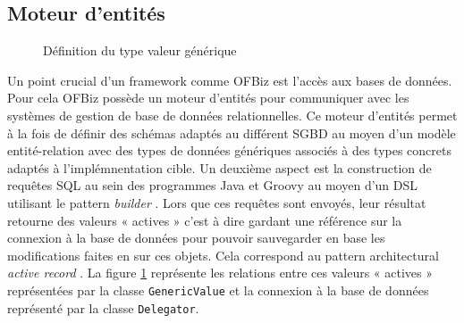 \documentclass[a4paper, 11pt]{report}
\begin{document}
\subsection{Moteur d'entités}

\begin{figure}
  \centering
  \caption{Définition du type valeur générique}
  \label{fig:genericvalue}
\end{figure}

Un point crucial d'un framework comme OFBiz est l'accès aux bases de
données. Pour cela OFBiz possède un moteur d'entités pour communiquer
avec les systèmes de gestion de base de données relationnelles. Ce
moteur d'entités permet à la fois de définir des schémas adaptés au
différent SGBD au moyen d'un modèle entité-relation avec des types de
données génériques associés à des types concrets adaptés à
l'implémnentation cible. Un deuxième aspect est la construction de
requêtes SQL au sein des programmes Java et Groovy au moyen d'un DSL
utilisant le pattern \emph{builder} \cite{gamma1993design}. Lors que
ces requêtes sont envoyés, leur résultat retourne des valeurs «
actives » c'est à dire gardant une référence sur la connexion à la
base de données pour pouvoir sauvegarder en base les modifications
faites en sur ces objets. Cela correspond au pattern architectural
\emph{active record} \cite{fowler2002patterns}. La figure
\ref{fig:genericvalue} représente les relations entre ces valeurs «
actives » représentées par la classe \verb=GenericValue= et la
connexion à la base de données représenté par la classe
\verb=Delegator=.
\end{document}
